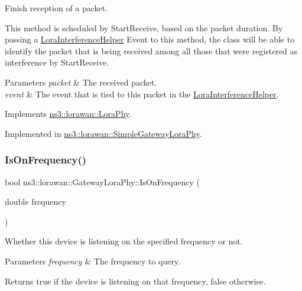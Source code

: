 Finish reception of a packet.

This method is scheduled by Start\+Receive, based on the packet duration. By passing a \hyperlink{classns3_1_1lorawan_1_1LoraInterferenceHelper}{Lora\+Interference\+Helper} Event to this method, the class will be able to identify the packet that is being received among all those that were registered as interference by Start\+Receive.


\begin{DoxyParams}{Parameters}
{\em packet} & The received packet. \\
\hline
{\em event} & The event that is tied to this packet in the \hyperlink{classns3_1_1lorawan_1_1LoraInterferenceHelper}{Lora\+Interference\+Helper}. \\
\hline
\end{DoxyParams}


Implements \hyperlink{classns3_1_1lorawan_1_1LoraPhy_a719f749890c247abc3fda290d384c37f}{ns3\+::lorawan\+::\+Lora\+Phy}.



Implemented in \hyperlink{classns3_1_1lorawan_1_1SimpleGatewayLoraPhy_aefb2464599926253bfb1003fa14f8fae}{ns3\+::lorawan\+::\+Simple\+Gateway\+Lora\+Phy}.

\mbox{\label{classns3_1_1lorawan_1_1GatewayLoraPhy_a293b678aaaf872fb1d6c0385bbab9d71}} 
\subsubsection{\texorpdfstring{Is\+On\+Frequency()}{IsOnFrequency()}}
{\footnotesize\ttfamily bool ns3\+::lorawan\+::\+Gateway\+Lora\+Phy\+::\+Is\+On\+Frequency (\begin{DoxyParamCaption}\item[{double}]{frequency }\end{DoxyParamCaption})\hspace{0.3cm}{\ttfamily [virtual]}}

Whether this device is listening on the specified frequency or not.


\begin{DoxyParams}{Parameters}
{\em frequency} & The frequency to query. \\
\hline
\end{DoxyParams}
\begin{DoxyReturn}{Returns}
true if the device is listening on that frequency, false otherwise. 
\end{DoxyReturn}


